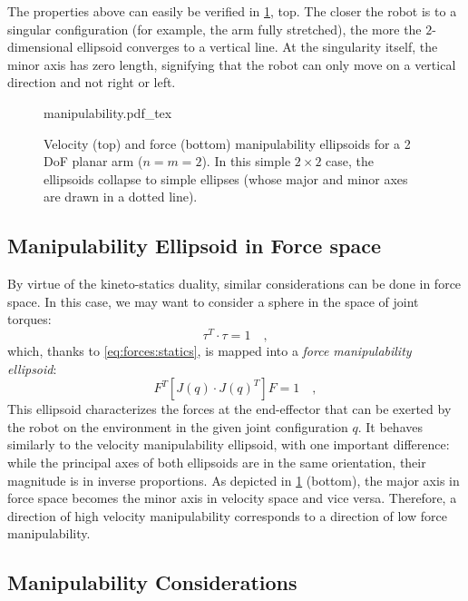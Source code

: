 The properties above can easily be verified in \cref{fig:manipulability}, top. The closer the robot is to a singular configuration (for example, the arm fully stretched), the more the $2$-dimensional ellipsoid converges to a vertical line. At the singularity itself, the minor axis has zero length, signifying that the robot can only move on a vertical direction and not right or left.

\begin{figure}[!t]
    \centering
    \def\svgwidth{0.8\textwidth}
    {manipulability.pdf_tex}
    \caption{Velocity (top) and force (bottom) manipulability ellipsoids for a 2 DoF planar arm ($n=m=2$). In this simple $2\times2$ case, the ellipsoids collapse to simple ellipses (whose major and minor axes are drawn in a dotted line).}\label{fig:manipulability}
\end{figure}

\subsection{Manipulability Ellipsoid in Force space}

By virtue of the kineto-statics duality, similar considerations can be done in force space. In this case, we may want to consider a sphere in the space of joint torques:
\begin{equation}
\tau^T\cdot\tau = 1 \quad ,  \label{eq:forces:manipulability:torquesphere}
\end{equation}
which, thanks to \cref{eq:forces:statics}, is mapped into a \textsl{force manipulability ellipsoid}:
\begin{equation}
F^T \left[ J(q) \cdot J(q)^T \right] F = 1 \quad ,
\label{eq:forces:manipulability:forcemanipulability}
\end{equation}
This ellipsoid characterizes the forces at the end-effector that can be exerted by the robot on the environment in the given joint configuration $q$. It behaves similarly to the velocity manipulability ellipsoid, with one important difference: while the principal axes of both ellipsoids are in the same orientation, their magnitude is in inverse proportions.
As depicted in \cref{fig:manipulability} (bottom), the major axis in force space becomes the minor axis in velocity space and vice versa.
Therefore, a direction of high velocity manipulability corresponds to a direction of low force manipulability.

\subsection{Manipulability Considerations}

